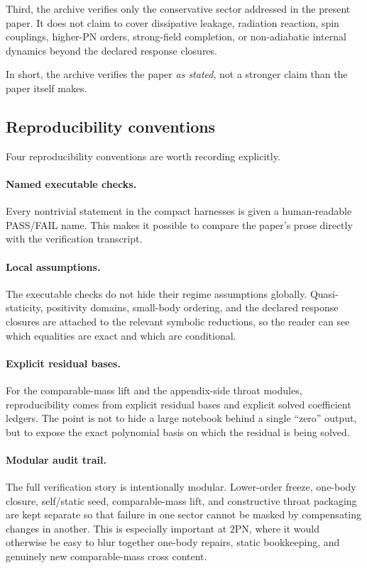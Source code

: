 \documentclass[11pt]{article}
\newcommand{\TwoPN}{\mathrm{2PN}}
\begin{document}
Third, the archive verifies only the conservative sector addressed in the present paper.
It does not claim to cover dissipative leakage, radiation reaction, spin couplings,
higher-PN orders, strong-field completion, or non-adiabatic internal dynamics beyond the
declared response closures.

In short, the archive verifies the paper \emph{as stated}, not a stronger claim than the
paper itself makes.

\subsection{Reproducibility conventions}
\label{sec:verification-conventions}

Four reproducibility conventions are worth recording explicitly.

\paragraph{Named executable checks.}
Every nontrivial statement in the compact harnesses is given a human-readable PASS/FAIL
name.  This makes it possible to compare the paper's prose directly with the verification
transcript.

\paragraph{Local assumptions.}
The executable checks do not hide their regime assumptions globally.
Quasi-staticity, positivity domains, small-body ordering, and the declared response
closures are attached to the relevant symbolic reductions, so the reader can see which
equalities are exact and which are conditional.

\paragraph{Explicit residual bases.}
For the comparable-mass lift and the appendix-side throat modules, reproducibility comes
from explicit residual bases and explicit solved coefficient ledgers.
The point is not to hide a large notebook behind a single ``zero'' output, but to expose
the exact polynomial basis on which the residual is being solved.

\paragraph{Modular audit trail.}
The full verification story is intentionally modular.
Lower-order freeze, one-body closure, self/static seed, comparable-mass lift, and
constructive throat packaging are kept separate so that failure in one sector cannot be
masked by compensating changes in another.
This is especially important at \(\TwoPN\), where it would otherwise be easy to blur
together one-body repairs, static bookkeeping, and genuinely new comparable-mass cross
content.
\end{document}
